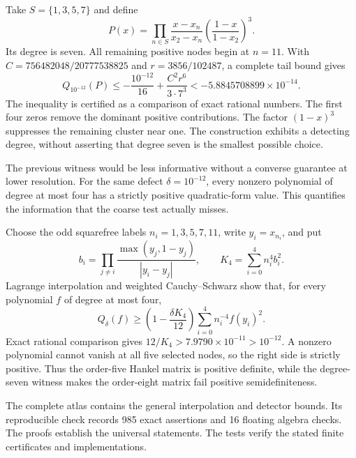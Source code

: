 Take $S=\{1,3,5,7\}$ and define
\[
P(x)=\prod_{n\in S}\frac{x-x_n}{x_2-x_n}
 \left(\frac{1-x}{1-x_2}\right)^3.
\]
Its degree is seven. All remaining positive nodes begin at $n=11$.
With
$C=756482048/20777538825$ and $r=3856/102487$, a complete tail bound gives
\[
Q_{10^{-12}}(P)\le-\frac{10^{-12}}{16}
 +\frac{C^2r^6}{3\cdot7^3}
 <-5.8845708899\times10^{-14}.
\]
The inequality is certified as a comparison of exact rational numbers.
The first four zeros remove the dominant positive contributions.
The factor $(1-x)^3$ suppresses the remaining cluster near one.
The construction exhibits a detecting degree, without asserting that degree
seven is the smallest possible choice.

The previous witness would be less informative without a converse guarantee
at lower resolution. For the same defect $\delta=10^{-12}$, every nonzero
polynomial of degree at most four has a strictly positive quadratic-form value. This quantifies
the information that the coarse test actually misses.


Choose the odd squarefree labels $n_i=1,3,5,7,11$, write $y_i=x_{n_i}$,
and put
\[
b_i=\prod_{j\ne i}\frac{\max(y_j,1-y_j)}{|y_i-y_j|},
\qquad K_4=\sum_{i=0}^{4}n_i^4b_i^2.
\]
Lagrange interpolation and weighted Cauchy--Schwarz show that, for every
polynomial $f$ of degree at most four,
\[
Q_\delta(f)\ge
\left(1-\frac{\delta K_4}{12}\right)
\sum_{i=0}^{4}n_i^{-4}f(y_i)^2.
\]
Exact rational comparison gives $12/K_4>7.9790\times10^{-11}>10^{-12}$.
A nonzero polynomial cannot vanish at all five selected nodes, so the right
side is strictly positive. Thus the order-five Hankel matrix is positive
definite, while the degree-seven witness makes the order-eight matrix fail
positive semidefiniteness.

The complete atlas contains the general interpolation and detector bounds.
Its reproducible check records 985 exact assertions and 16 floating algebra
checks. The proofs establish the universal statements. The tests verify the
stated finite certificates and implementations.
